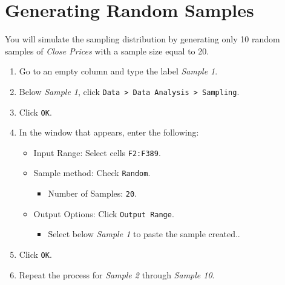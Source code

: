 \documentclass[
  12pt,
  letterpaper,
]{book}
\providecommand{\tightlist}{%
  \setlength{\itemsep}{0pt}\setlength{\parskip}{0pt}}
\begin{document}
\hypertarget{generating-random-samples}{%
\section{Generating Random Samples}\label{generating-random-samples}}

You will simulate the sampling distribution by generating only 10 random samples of \emph{Close Prices} with a sample size equal to 20.

\begin{enumerate}
\def\labelenumi{\arabic{enumi}.}
\tightlist
\item
  Go to an empty column and type the label \emph{Sample 1}.
\item
  Below \emph{Sample 1}, click \texttt{Data\ \textgreater{}\ Data\ Analysis\ \textgreater{}\ Sampling}.
\item
  Click \texttt{OK}.
\item
  In the window that appears, enter the following:

  \begin{itemize}
  \tightlist
  \item
    Input Range: Select cells \texttt{F2:F389}.
  \item
    Sample method: Check \texttt{Random}.

    \begin{itemize}
    \tightlist
    \item
      Number of Samples: \texttt{20}.
    \end{itemize}
  \item
    Output Options: Click \texttt{Output\ Range}.

    \begin{itemize}
    \tightlist
    \item
      Select below \emph{Sample 1} to paste the sample created..
    \end{itemize}
  \end{itemize}
\item
  Click \texttt{OK}.
\item
  Repeat the process for \emph{Sample 2} through \emph{Sample 10}.
\end{enumerate}
\end{document}
